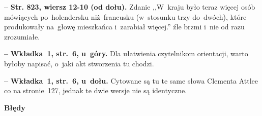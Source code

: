 \documentclass[a4paper,11pt]{article}  %
\newcommand{\spaceFour}{0.5em}
\newcommand{\tb}{\textbf}
\newcommand{\noi}{\noindent}
\newcommand{\start}{\noi \tb{--} {}}
\newcommand{\StrWd}[2]{\tb{Str. #1, wiersz #2 (od dołu).}}
\newcommand{\Center}[1]{\begin{center} #1 \end{center}}
\newcommand{\CenterTB}[1]{\Center{\tb{#1}}}
\begin{document}
\vspace{\spaceFour}


\start \StrWd{823}{12-10} Zdanie ,,W~kraju było teraz więcej osób
mówiących po~holendersku niż~francusku (w~stosunku trzy do~dwóch),
które produkowały na~głowę mieszkańca i~zarabiał więcej.'' źle brzmi
i~nie od razu zrozumiałe.

\vspace{\spaceFour}


\start \tb{Wkładka~1, str.~6, u~góry.} Dla ułatwienia czytelnikom
orientacji, warto byłoby napisać, o~jaki akt stworzenia tu chodzi.

\vspace{\spaceFour}


\start \tb{Wkładka~1, str.~6, u~dołu.} Cytowane są tu te same słowa
Clementa Attlee co na stronie~127, jednak te dwie wersje nie są
identyczne.


\CenterTB{Błędy}

\nopagebreak
\end{document}
